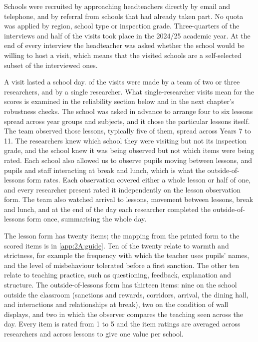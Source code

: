 Schools were recruited by approaching headteachers directly by
email and telephone, and by referral from schools that had already taken
part. No quota was applied by region, school type or inspection grade.
Three-quarters of the interviews and half of the visits took place in the
2024/25 academic year. At the end of every interview the headteacher was
asked whether the school would be willing to host a visit, which means that
the visited schools are a self-selected subset of the interviewed ones.

A visit lasted a school day. \DaysTwoPlusRaters{} of the \NTierOne{}
visits were made by a team of two or three researchers, and
\DaysOneRater{} by a single researcher. What
single-researcher visits mean for the scores is examined in the
reliability section below and in the next chapter's robustness checks. The
school was asked in advance to arrange four to six
lessons spread across year groups and subjects, and it chose the particular
lessons itself. The team observed those lessons, typically five of them,
spread across Years 7 to 11. The researchers knew which school they were
visiting but not its inspection grade, and the school knew it was being
observed but not which items were being rated. Each school also allowed us
to observe pupils moving between lessons, and pupils and staff interacting
at break and lunch, which is what the outside-of-lessons form rates. Each observation covered
either a whole lesson or half of one, and every researcher present rated it independently on the
lesson observation form. The team also watched arrival to lessons, movement between lessons,
break and lunch, and
at the end of the day each researcher completed the outside-of-lessons form once,
summarising the whole day.

The lesson form has twenty items; the mapping from the printed form to the scored items
is in \cref{app:2A:guide}. Ten of the
twenty relate to warmth and strictness, for example the
frequency with which the teacher uses pupils' names, and the level of
misbehaviour tolerated before a first sanction. The other ten relate to
teaching practice, such as questioning, feedback, explanation and structure.
The outside-of-lessons form has thirteen items: nine on the school outside
the classroom (sanctions and rewards, corridors, arrival, the dining hall,
and interactions and relationships at break), two on the condition of wall
displays, and two in which the observer compares the teaching seen across
the day. Every item is rated from 1 to 5 and the item ratings are averaged across
researchers and across lessons to give one value per school.

